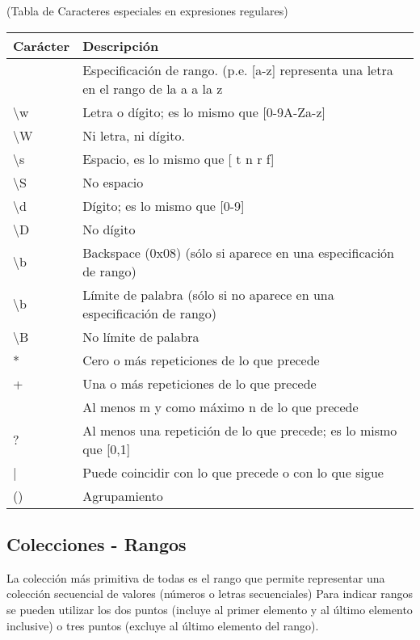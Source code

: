 \documentclass{article}
\begin{document}
(Tabla de Caracteres especiales en expresiones regulares)

\begin{tabular}{| l | l |}
	\hline
	Carácter			&	Descripción													\\
	\hline \hline
	[]				&	Especificación de rango. (p.e. [a-z] representa una letra en el rango de la a a la z	\\
	\hline
	\textbackslash w		&	Letra o dígito; es lo mismo que [0-9A-Za-z]								\\
	\hline
	\textbackslash W	&	Ni letra, ni dígito.												\\
	\hline
	\textbackslash s		&	Espacio, es lo mismo que [ t n r f]									\\
	\hline
	\textbackslash S		&	No espacio														\\
	\hline
	\textbackslash d		&	Dígito; es lo mismo que [0-9]										\\
	\hline
	\textbackslash D		&	No dígito														\\
	\hline
	\textbackslash b		&	Backspace (0x08) (sólo si aparece en una especificación de rango)				\\
	\hline
	\textbackslash b		&	Límite de palabra (sólo si no aparece en una especificación de rango)			\\
	\hline
	\textbackslash B		&	No límite de palabra												\\
	\hline
	*				&	Cero o más repeticiones de lo que precede								\\
	\hline
	+				&	Una o más repeticiones de lo que precede								\\
	\hline
	[m,n]			&	Al menos m y como máximo n de lo que precede							\\
	\hline
	?	 			&	Al menos una repetición de lo que precede; es lo mismo que [0,1]				\\
	\hline
	| 				&	Puede coincidir con lo que precede o con lo que sigue						\\
	\hline
	() 				&	Agrupamiento													\\
	\hline
\end{tabular}


 
\bigskip

\subsection{Colecciones - Rangos}
La colección más primitiva de todas es el rango que permite representar una colección secuencial de valores (números o letras secuenciales)
Para indicar rangos se pueden utilizar los dos puntos (incluye al primer elemento y al último elemento inclusive) o tres puntos (excluye al último elemento del rango).
\end{document}
